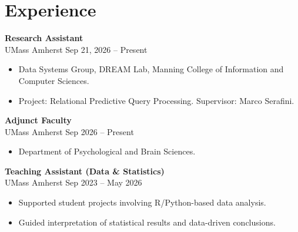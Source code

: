 \documentclass[10pt, letterpaper]{article}
\begin{document}



    \section*{Experience}
    \textbf{Research Assistant} \\
UMass Amherst \hfill Sep 21, 2026 -- Present
\begin{itemize}
    \item Data Systems Group, DREAM Lab, Manning College of Information and Computer Sciences.
    \item Project: Relational Predictive Query Processing. Supervisor: Marco Serafini.
\end{itemize}

    \textbf{Adjunct Faculty} \\
UMass Amherst \hfill Sep 2026 -- Present
\begin{itemize}
    \item Department of Psychological and Brain Sciences.
\end{itemize}

    \textbf{Teaching Assistant (Data \& Statistics)} \\
UMass Amherst \hfill Sep 2023 -- May 2026
\begin{itemize}
    \item Supported student projects involving R/Python-based data analysis.
    \item Guided interpretation of statistical results and data-driven conclusions.
\end{itemize}
\end{document}
